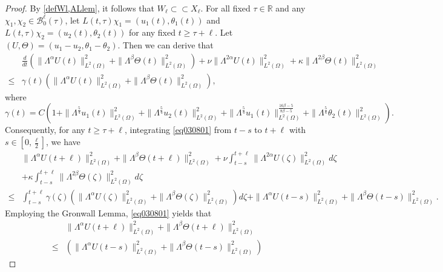 \documentclass[oneside,preprint,12pt,numbers,sort&compress]{elsarticle}
\begin{document}
\begin{proof}
By \cref{defWl,ALlem}, it follows that $ W_\ell \subset\subset X_\ell $. For all fixed $\tau \in \mathbb{R}$ and any $\chi_{1}, \chi_{2} \in \mathcal{B}_{0}^{\ell}(\tau)$, let $L(t, \tau)\chi_1 = (u_1(t), \theta_1(t))$ and $L(t, \tau)\chi_2 = (u_2(t), \theta_2(t))$ for any fixed $t \geq \tau + \ell$. Let $(U, \Theta) = (u_1 - u_2, \theta_1 - \theta_2)$. Then we can derive that
\begin{equation}\label{eq030801}
\begin{aligned}
& \frac{d}{dt}
\left( 
\| \Lambda^{\alpha}U(t) \|_{L^2(\Omega)}^{2} + \| \Lambda^{\beta}\Theta (t) \|_{L^2(\Omega)}^{2} 
\right)
+\nu \| \Lambda^{2\alpha}U(t) \|_{L^2(\Omega)}^{2} 
+\kappa \| \Lambda^{2\beta}\Theta(t) \|_{L^2(\Omega)}^{2} 
\\
\leq
& 
\gamma(t)
\left( 
\| \Lambda^{\alpha}U(t) \|_{L^2(\Omega)}^{2} + \| \Lambda^{\beta}\Theta (t) \|_{L^2(\Omega)}^{2}
\right),
\end{aligned}
\end{equation}
where
$$
\gamma(t)=
C \left( 1+
\| \Lambda^{\frac{5}{4}}u_1 (t) \|_{L^2(\Omega)}^{2} 
+\| \Lambda^{\frac{5}{4}}u_2 (t) \|_{L^2(\Omega)}^{2} 
+ \| \Lambda^{\frac{5}{4}} u_1 (t) \|_{L^2(\Omega)}^{\frac{16\beta-5}{8\beta-5}}
+ \| \Lambda^{\frac{5}{4}}\theta_2 (t) \|_{L^2(\Omega)}^{2} 
\right).
$$
Consequently, for any $t \geq \tau + \ell$, integrating \cref{eq030801} from $t-s$ to $t+\ell$ with $s\in [0,\frac{\ell}{2}]$, we have
\begin{align*}
&
\| \Lambda^{\alpha}U(t+\ell) \|_{L^2(\Omega)}^{2} 
+ \| \Lambda^{\beta}\Theta (t+\ell) \|_{L^2(\Omega)}^{2} 
+\nu \int_{t-s}^{t+\ell} \| \Lambda^{2\alpha} U(\zeta) \|_{L^2(\Omega)}^{2} d\zeta\\
&
+\kappa \int_{t-s}^{t+\ell} \| \Lambda^{2\beta} \Theta (\zeta) \|_{L^2(\Omega)}^{2} d\zeta
\\
\leq
& \int_{t-s}^{t+\ell}
\gamma(\zeta)
\left( 
\| \Lambda^{\alpha}U(\zeta) \|_{L^2(\Omega)}^{2} + \| \Lambda^{\beta}\Theta(\zeta) \|_{L^2(\Omega)}^{2} 
\right) d\zeta 
+ \| \Lambda^{\alpha}U(t-s) \|_{L^2(\Omega)}^{2} 
+ \| \Lambda^{\beta}\Theta (t-s) \|_{L^2(\Omega)}^{2}.
\end{align*}
Employing the Gronwall Lemma, \cref{eq030801} yields that 
\begin{align*}
&\| \Lambda^{\alpha}U(t+\ell) \|_{L^2(\Omega)}^{2} 
+ \| \Lambda^{\beta}\Theta (t+\ell) \|_{L^2(\Omega)}^{2} \\
\leq&
\left( \| \Lambda^{\alpha}U(t-s) \|_{L^2(\Omega)}^{2} 
+ \| \Lambda^{\beta}\Theta (t-s) \|_{L^2(\Omega)}^{2} \right)

\end{align*}
\end{proof}
\end{document}
